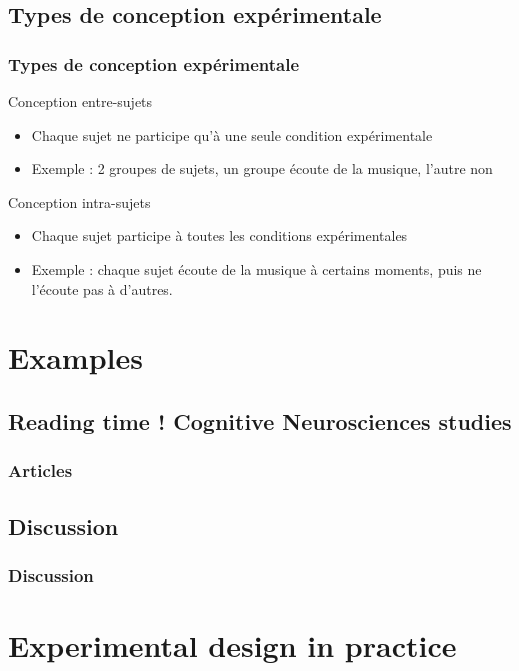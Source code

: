 \documentclass[xcolor=dvipsnames,english]{beamer}
\begin{document}
\subsection{Types de conception expérimentale}

\begin{frame}
  \frametitle{Types de conception expérimentale}

  \begin{block}{Conception entre-sujets}
    \begin{itemize}
      \item<1-> Chaque sujet ne participe qu'à une seule condition expérimentale
      \item<2-> Exemple : 2 groupes de sujets, un groupe écoute de la musique, l'autre non
    \end{itemize}
  \end{block}

  \begin{block}{Conception intra-sujets}
    \begin{itemize}
      \item<3-> Chaque sujet participe à toutes les conditions expérimentales
      \item<4-> Exemple : chaque sujet écoute de la musique à certains moments, puis ne l'écoute pas à d'autres.
    \end{itemize}
  \end{block}
\end{frame}

\section{Examples}
\subsection{Reading time ! Cognitive Neurosciences studies}

\begin{frame}
  \frametitle{Articles}
\end{frame}

\subsection{Discussion}

\begin{frame}
  \frametitle{Discussion}
\end{frame}


\section{Experimental design in practice}
\end{document}
